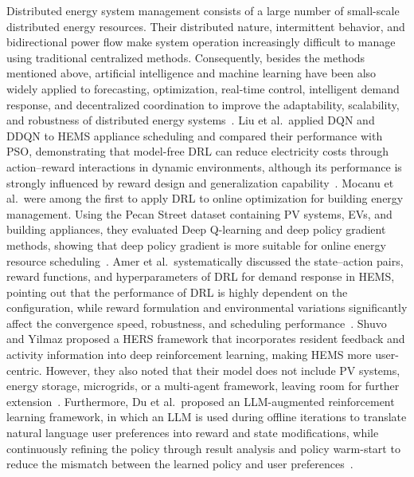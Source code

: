 Distributed energy system management consists of a large number of small-scale distributed energy resources. Their distributed nature, intermittent behavior, and bidirectional power flow make system operation increasingly difficult to manage using traditional centralized methods. Consequently, besides the methods mentioned above, artificial intelligence and machine learning have been also widely applied to forecasting, optimization, real-time control, intelligent demand response, and decentralized coordination to improve the adaptability, scalability, and robustness of distributed energy systems~\parencite{SATPATHY2026127109}. Liu et al.\ applied DQN and DDQN to HEMS appliance scheduling and compared their performance with PSO, demonstrating that model-free DRL can reduce electricity costs through action--reward interactions in dynamic environments, although its performance is strongly influenced by reward design and generalization capability~\parencite{Liu2020572}. Mocanu et al.\ were among the first to apply DRL to online optimization for building energy management. Using the Pecan Street dataset containing PV systems, EVs, and building appliances, they evaluated Deep Q-learning and deep policy gradient methods, showing that deep policy gradient is more suitable for online energy resource scheduling~\parencite{MOCANU20193698}. Amer et al.\ systematically discussed the state--action pairs, reward functions, and hyperparameters of DRL for demand response in HEMS, pointing out that the performance of DRL is highly dependent on the configuration, while reward formulation and environmental variations significantly affect the convergence speed, robustness, and scheduling performance~\parencite{en15218235}. Shuvo and Yilmaz proposed a HERS framework that incorporates resident feedback and activity information into deep reinforcement learning, making HEMS more user-centric. However, they also noted that their model does not include PV systems, energy storage, microgrids, or a multi-agent framework, leaving room for further extension~\parencite{9733029}. Furthermore, Du et al.\ proposed an LLM-augmented reinforcement learning framework, in which an LLM is used during offline iterations to translate natural language user preferences into reward and state modifications, while continuously refining the policy through result analysis and policy warm-start to reduce the mismatch between the learned policy and user preferences~\parencite{DU2026127976}.

